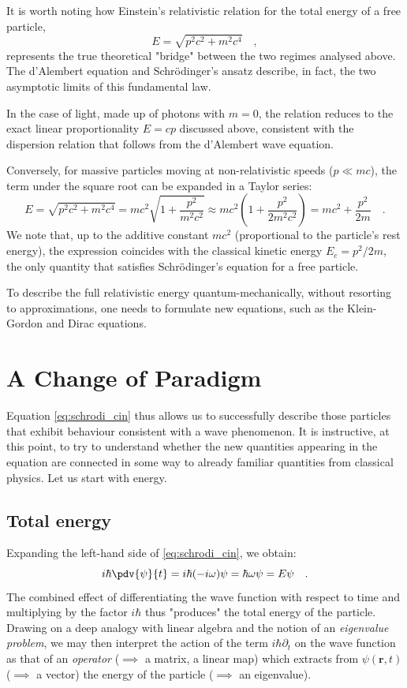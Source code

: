 \begin{approfondimento}[title={A bridge between the two worlds: special relativity}]
It is worth noting how Einstein's relativistic relation for the total energy of a free particle,
\[
    E = \sqrt{p^2c^2 + m^2c^4} \quad,
\]
represents the true theoretical "bridge" between the two regimes analysed above. The d'Alembert equation and Schrödinger's ansatz describe, in fact, the two asymptotic limits of this fundamental law.

In the case of light, made up of photons with $m = 0$, the relation reduces to the exact linear proportionality $E = cp$ discussed above, consistent with the dispersion relation that follows from the d'Alembert wave equation.

Conversely, for massive particles moving at non-relativistic speeds ($p \ll mc$), the term under the square root can be expanded in a Taylor series:
\[
    E = \sqrt{p^2c^2 + m^2c^4} = mc^2\sqrt{1 + \frac{p^2}{m^2c^2}} \approx mc^2\left( 1 + \frac{p^2}{2m^2c^2} \right) = mc^2 + \frac{p^2}{2m} \quad.
\]
We note that, up to the additive constant $mc^2$ (proportional to the particle's rest energy), the expression coincides with the classical kinetic energy $E_c = p^2/2m$, the only quantity that satisfies Schrödinger's equation for a free particle.

To describe the full relativistic energy quantum-mechanically, without resorting to approximations, one needs to formulate new equations, such as the Klein-Gordon and Dirac equations.
\end{approfondimento}

\section{A Change of Paradigm}
Equation \eqref{eq:schrodi_cin} thus allows us to successfully describe those particles that exhibit behaviour consistent with a wave phenomenon. It is instructive, at this point, to try to understand whether the new quantities appearing in the equation are connected in some way to already familiar quantities from classical physics. Let us start with energy.

\subsection{Total energy}
Expanding the left-hand side of \eqref{eq:schrodi_cin}, we obtain:
\begin{equation}
        i\hbar \pdv{\psi}{t} = i\hbar (-i\omega)\psi = \hbar \omega \psi = E\psi \quad.
        \label{eq:op_E}
\end{equation}
The combined effect of differentiating the wave function with respect to time and multiplying by the factor $i\hbar$ thus "produces" the total energy of the particle. Drawing on a deep analogy with linear algebra and the notion of an \emph{eigenvalue problem}, we may then interpret the action of the term $i\hbar \partial_t$ on the wave function as that of an \emph{operator} ($\implies$ a matrix, a linear map) which extracts from $\psi(\bm{r},t)$ ($\implies$ a vector) the energy of the particle ($\implies$ an eigenvalue).

